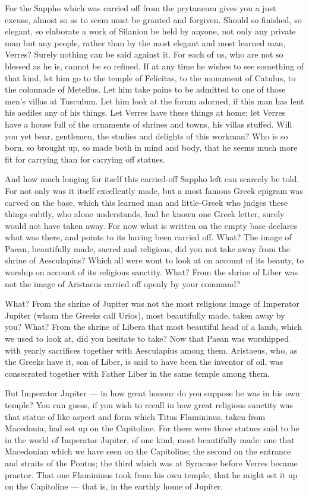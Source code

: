  For the Sappho which was carried off from the prytaneum gives you a just excuse, almost so as to seem must be granted and forgiven. Should so finished, so elegant, so elaborate a work of Silanion be held by anyone, not only any private man but any people, rather than by the most elegant and most learned man, Verres? Surely nothing can be said against it. For each of us, who are not so blessed as he is, cannot be so refined. If at any time he wishes to see something of that kind, let him go to the temple of Felicitas, to the monument of Catulus, to the colonnade of Metellus. Let him take pains to be admitted to one of those men's villas at Tusculum. Let him look at the forum adorned, if this man has lent his aediles any of his things. Let Verres have these things at home; let Verres have a house full of the ornaments of shrines and towns, his villas stuffed. Will you yet bear, gentlemen, the studies and delights of this workman? Who is so born, so brought up, so made both in mind and body, that he seems much more fit for carrying than for carrying off statues.

 And how much longing for itself this carried-off Sappho left can scarcely be told. For not only was it itself excellently made, but a most famous Greek epigram was carved on the base, which this learned man and little-Greek who judges these things subtly, who alone understands, had he known one Greek letter, surely would not have taken away. For now what is written on the empty base declares what was there, and points to its having been carried off. What? The image of Paean, beautifully made, sacred and religious, did you not take away from the shrine of Aesculapius? Which all were wont to look at on account of its beauty, to worship on account of its religious sanctity. What? From the shrine of Liber was not the image of Aristaeus carried off openly by your command?

 What? From the shrine of Jupiter was not the most religious image of Imperator Jupiter (whom the Greeks call Urios), most beautifully made, taken away by you? What? From the shrine of Libera that most beautiful head of a lamb, which we used to look at, did you hesitate to take? Now that Paean was worshipped with yearly sacrifices together with Aesculapius among them. Aristaeus, who, as the Greeks have it, son of Liber, is said to have been the inventor of oil, was consecrated together with Father Liber in the same temple among them.

 But Imperator Jupiter --- in how great honour do you suppose he was in his own temple? You can guess, if you wish to recall in how great religious sanctity was that statue of like aspect and form which Titus Flamininus, taken from Macedonia, had set up on the Capitoline. For there were three statues said to be in the world of Imperator Jupiter, of one kind, most beautifully made: one that Macedonian which we have seen on the Capitoline; the second on the entrance and straits of the Pontus; the third which was at Syracuse before Verres became praetor. That one Flamininus took from his own temple, that he might set it up on the Capitoline --- that is, in the earthly home of Jupiter.

